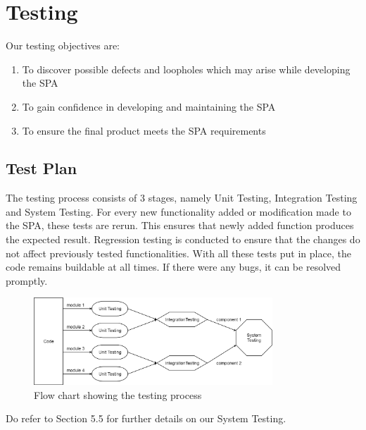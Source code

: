 \documentclass[12pt]{article}
\begin{document}
{{{{{{{{{{{{{\section{Testing}
Our testing objectives are: 
\begin{enumerate}
\item To discover possible defects and loopholes which may arise while developing the SPA
\item To gain confidence in developing and maintaining the  SPA
\item To ensure the final product meets the SPA requirements
\end{enumerate}
\subsection{Test Plan}
The testing process consists of 3 stages, namely Unit Testing, Integration Testing and System Testing. For every new functionality added or modification made to the SPA, these tests are rerun. This ensures that newly added function produces the expected result. Regression testing is conducted to ensure that the changes do not affect previously tested functionalities. With all these tests put in place, the code remains buildable at all times. If there were any bugs, it can be resolved promptly.
\begin{figure}[h]
  \centering 
  \caption{Flow chart showing the testing process}
 \includegraphics[width=0.8\textwidth]{Testing_process.png}
\end{figure}
Do refer to Section 5.5 for further details on our System Testing.
}}}}}}}}}}}}}
\end{document}
